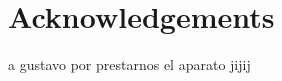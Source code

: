 \documentclass[fleqn,usenatbib]{mnras}
\begin{document}






\section*{Acknowledgements}

a gustavo por prestarnos el aparato jijij






\bsp	%
\label{lastpage}
\end{document}
